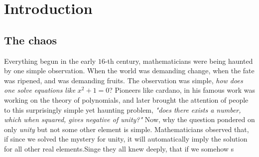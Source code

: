 \chapter{Introduction}

\section{The chaos}
Everything begun in the early $16$-th century, mathematicians were being haunted by one simple observation. When the world was demanding change, when the fate was ripened, and was demanding fruits. 
The observation was simple, \emph{how does one solve equations like} $x^2 + 1 = 0$?
Pioneers like cardano, in his famous work was working on the theory of polynomials, and later brought the attention of people to this surprisingly simple yet haunting problem, \emph{"does there exists a number, which when squared, gives negative of unity?"} 
Now, why the question pondered on only \emph{unity} but not some other element is simple.
Mathematicians observed that, if since we solved the mystery for unity, it will automatically imply the solution for all other real elements.Singe they all knew deeply, that if we somehow s